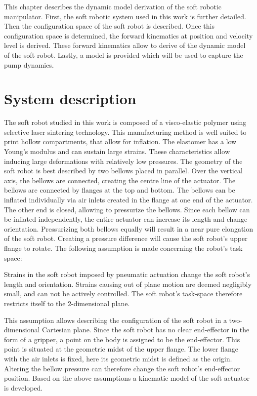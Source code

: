 \label{chap2}

This chapter describes the dynamic model derivation of the soft robotic manipulator. First, the soft robotic system used in this work is further detailed. Then the configuration space of the soft robot is described. Once this configuration space is determined, the forward kinematics at position and velocity level is derived. These forward kinematics allow to derive of the dynamic model of the soft robot. Lastly, a model is provided which will be used to capture the pump dynamics. 



\section{System description}

The soft robot studied in this work is composed of a visco-elastic polymer using selective laser sintering technology. This manufacturing method is well suited to print hollow compartments, that allow for inflation. The elastomer has a low Young's modulus and can sustain large strains. These characteristics allow inducing large deformations with relatively low pressures. The geometry of the soft robot is best described by two bellows placed in parallel. Over the vertical axis, the bellows are connected, creating the centre line of the actuator. The bellows are connected by flanges at the top and bottom. The bellows can be inflated individually via air inlets created in the flange at one end of the actuator. The other end is closed, allowing to pressurize the bellows. Since each bellow can be inflated independently, the entire actuator can increase its length and change orientation. Pressurizing both bellows equally will result in a near pure elongation of the soft robot. Creating a pressure difference will cause the soft robot's upper flange to rotate. The following assumption is made concerning the robot's task space:

\begin{theorem}
Strains in the soft robot imposed by pneumatic actuation change the soft robot's length and orientation. Strains causing out of plane motion are deemed negligibly small, and can not be actively controlled. The soft robot's task-space therefore restricts itself to the 2-dimensional plane.
\end{theorem}

This assumption allows describing the configuration of the soft robot in a two-dimensional Cartesian plane. Since the soft robot has no clear end-effector in the form of a gripper, a point on the body is assigned to be the end-effector. This point is situated at the geometric midst of the upper flange. The lower flange with the air inlets is fixed, here its geometric midst is defined as the origin. Altering the bellow pressure can therefore change the soft robot's end-effector position. Based on the above assumptions a kinematic model of the soft actuator is developed. 


